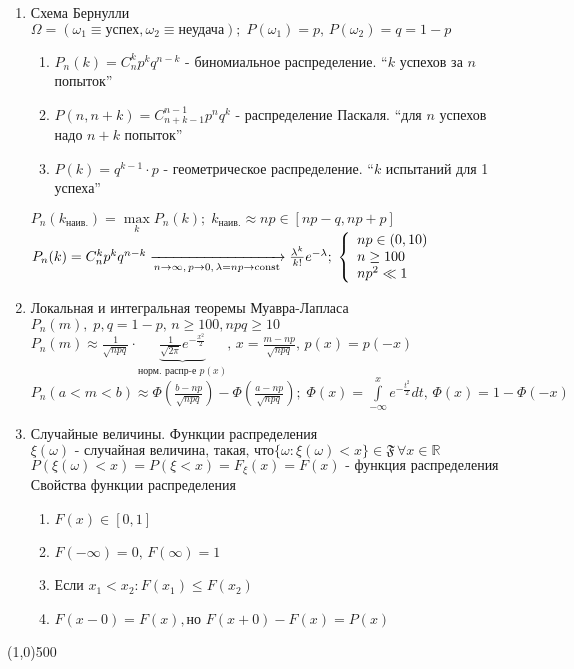 \begin{enumerate}[label=\textbf{\underline{\arabic*.}}]
\begin{enumerate}
      \end{enumerate}
\item Схема Бернулли\\
      $\Omega = (\omega_1\equiv\text{успех},\omega_2\equiv\text{неудача});\;
      P(\omega_1)=p,\, P(\omega_2)=q=1-p $\\
      \begin{enumerate}
      \item $P_n(k)=C^k_n p^k q^{n-k} $ - биномиальное распределение. ``$k$ успехов за $n$ попыток''
      \item $P(n,n{+}k)=C^{n-1}_{n+k-1}p^n q^k $ - распределение Паскаля. ``для $n$ успехов надо $n{+}k$ попыток''
      \item $P(k)=q^{k-1}\cdot p $ - геометрическое распределение. ``$k$ испытаний для 1 успеха''
      \end{enumerate}
      $P_n(k_\text{наив.})=\max\limits_kP_n(k);\;k_\text{наив.}\approx np \in [np-q,np{+}p] $\\
      $P_n(k)=C^k_n p^k q^{n-k} \xrightarrow[n\rightarrow\infty,\,p\rightarrow 0,\,\lambda=np\rightarrow\operatorname{const}]{} \frac{ \lambda^k }{ k! } e^{ -\lambda };\;\left\{\begin{array}{l}np\in(0,10)\\n\ge 100\\np^2\ll 1\end{array}\right.  $
\item Локальная и интегральная теоремы Муавра-Лапласа\\
      $P_n(m),\;p,q=1-p,\,n\ge 100,npq \ge 10 $\\
      $P_n(m)\approx \frac1{\sqrt{npq}}\cdot \underbrace{\frac1{\sqrt{2\pi}}e^{-\frac{x^2}{2}}}_{\text{норм. распр-е } p(x)},\,x=\frac{m-np}{\sqrt{npq}},\,p(x)=p(-x) $\\
      $P_n(a<m<b)\approx \Phi(\frac{b-np}{\sqrt{npq}})-\Phi(\frac{a-np}{\sqrt{npq}});\;
      \Phi(x)=\int\limits_{-\infty}^x e^{-\frac{t^2}{2}}dt,\,\Phi(x)=1-\Phi(-x) $
\item Случайные величины. Функции распределения\\
      $\xi(\omega)\text{ - случайная величина, такая, что} \{\omega:\xi(\omega)<x\}\in\mathfrak{F}\, \forall x \in \mathbb{R} $\\
      $P(\xi(\omega)<x)=P(\xi<x)=F_\xi(x)=F(x)\text{ - функция распределения} $\\
      Свойства функции распределения
      \begin{enumerate}
      \item $F(x)\in [0,1] $
      \item $F(-\infty)=0,\,F(\infty)=1 $
      \item Если $x_1<x_2 : F(x_1)\le F(x_2)$
      \item $F(x-0)=F(x),\text{но }F(x+0)-F(x)=P(x) $
      \end{enumerate}
\end{enumerate}
\vfill\line(1,0){500}

